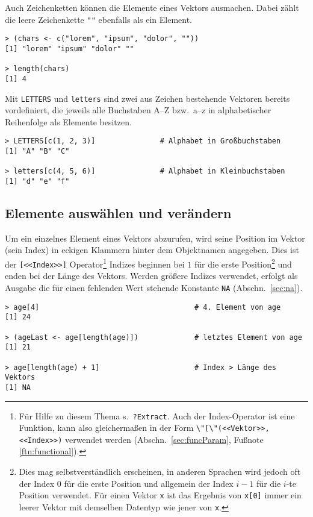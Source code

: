 Auch Zeichenketten können die Elemente eines Vektors ausmachen. Dabei zählt die leere Zeichenkette \lstinline!""! ebenfalls als ein Element.
\begin{lstlisting}
> (chars <- c("lorem", "ipsum", "dolor", ""))
[1] "lorem" "ipsum" "dolor" ""

> length(chars)
[1] 4
\end{lstlisting}

Mit \lstinline!LETTERS! und \lstinline!letters! sind zwei aus Zeichen bestehende Vektoren bereits vordefiniert, die jeweils alle Buchstaben A--Z bzw.\ a--z in alphabetischer Reihenfolge als Elemente besitzen.
\begin{lstlisting}
> LETTERS[c(1, 2, 3)]               # Alphabet in Großbuchstaben
[1] "A" "B" "C"

> letters[c(4, 5, 6)]               # Alphabet in Kleinbuchstaben
[1] "d" "e" "f"
\end{lstlisting}

\subsection{Elemente auswählen und verändern}
\label{sec:vecSel}

Um ein einzelnes Element eines Vektors abzurufen, wird seine Position im Vektor (sein Index) in eckigen Klammern hinter dem Objektnamen angegeben. Dies ist der \lstinline![<<Index>>]! Operator\footnote{Für Hilfe zu diesem Thema s.\ \lstinline!?Extract!. Auch der Index-Operator ist eine Funktion, kann also gleichermaßen in der Form \lstinline!\"[\"(<<Vektor>>, <<Index>>)! verwendet werden (Abschn.\ \ref{sec:funcParam}, Fußnote \ref{ftn:functional}).} Indizes beginnen bei $1$ für die erste Position\footnote{Dies mag selbstverständlich erscheinen, in anderen Sprachen wird jedoch oft der Index $0$ für die erste Position und allgemein der Index $i-1$ für die $i$\/-te Position verwendet. Für einen Vektor \lstinline!x! ist das Ergebnis von \lstinline!x[0]! immer ein leerer Vektor mit demselben Datentyp wie jener von \lstinline!x!.} und enden bei der Länge des Vektors. Werden größere Indizes verwendet, erfolgt als Ausgabe die für einen fehlenden Wert stehende Konstante \lstinline!NA! (Abschn.\ \ref{sec:na}).
\begin{lstlisting}
> age[4]                                    # 4. Element von age
[1] 24

> (ageLast <- age[length(age)])             # letztes Element von age
[1] 21

> age[length(age) + 1]                      # Index > Länge des Vektors
[1] NA
\end{lstlisting}

